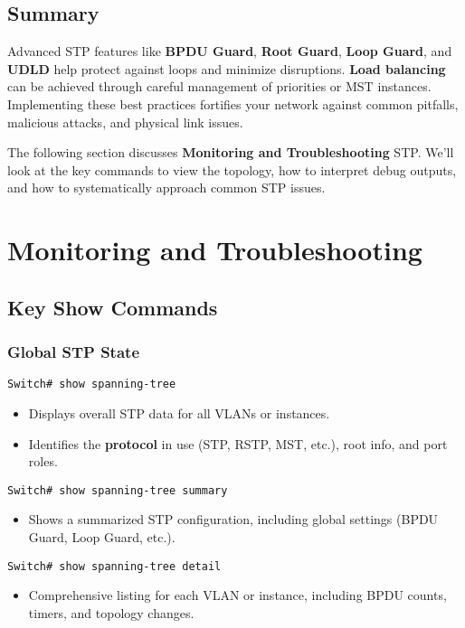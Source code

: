\documentclass[a4paper]{report}
\begin{document}
\section{Summary}
Advanced STP features like \textbf{BPDU Guard}, \textbf{Root Guard}, \textbf{Loop Guard}, and \textbf{UDLD} help protect against loops and minimize disruptions. \textbf{Load balancing} can be achieved through careful management of priorities or MST instances. Implementing these best practices fortifies your network against common pitfalls, malicious attacks, and physical link issues.

The following section discusses \textbf{Monitoring and Troubleshooting} STP. We’ll look at the key commands to view the topology, how to interpret debug outputs, and how to systematically approach common STP issues.


\chapter{Monitoring and Troubleshooting}

\section{Key Show Commands}
\subsection{Global STP State}
\begin{lstlisting}
Switch# show spanning-tree
\end{lstlisting}
\begin{itemize}
    \item Displays overall STP data for all VLANs or instances.
    \item Identifies the \textbf{protocol} in use (STP, RSTP, MST, etc.), root info, and port roles.
\end{itemize}
\begin{lstlisting}
Switch# show spanning-tree summary
\end{lstlisting}
\begin{itemize}
    \item Shows a summarized STP configuration, including global settings (BPDU Guard, Loop Guard, etc.).
\end{itemize}
\begin{lstlisting}
Switch# show spanning-tree detail
\end{lstlisting}
\begin{itemize}
    \item Comprehensive listing for each VLAN or instance, including BPDU counts, timers, and topology changes.
\end{itemize}
\end{document}

